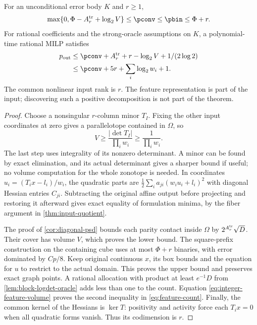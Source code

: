 \begin{theorem}\label{thm:integer-features}
For an unconditional error body $K$ and $r\ge1$,
\begin{equation}\label{eq:feature-finite}
 \max\{0,\Phi-A_r^{\rm tr}+\log_2V\}\le\pconv\le\pbin\le\Phi+r.
\end{equation}
For rational coefficients and the strong-oracle assumptions on $K$, a
polynomial-time rational MILP satisfies
\begin{equation}\label{eq:feature-count}
 \begin{split}
 p_{\rm out}&\le\pconv+A_r^{\rm tr}+r-\log_2V+1/(2\log2)\\
 &\le\pconv+5r+\sum_i\log_2w_i+1.
 \end{split}
\end{equation}
The common nonlinear input rank is $r$. The feature representation is
part of the input; discovering such a positive decomposition is not
part of the theorem.
\end{theorem}
\begin{proof}
Choose a nonsingular $r$-column minor $T_I$. Fixing the other input
coordinates at zero gives a parallelotope contained in $\Omega$, so
\begin{equation}\label{eq:integer-feature-volume}
 V\ge\frac{|\det T_I|}{\prod_iw_i}\ge\frac1{\prod_iw_i}.
\end{equation}
The last step uses integrality of its nonzero determinant. A minor can
be found by exact elimination, and its actual determinant gives a sharper
bound if useful; no volume computation for the whole zonotope is needed.
In coordinates $u_i=(T_ix-l_i)/w_i$, the quadratic parts are
$\frac12\sum_i a_{ji}(w_iu_i+l_i)^2$ with diagonal Hessian entries
$C_{ji}$. Subtracting the original affine output before projecting and
restoring it afterward gives exact equality of formulation minima,
by the fiber argument in \cref{thm:input-quotient}.

The proof of \cref{cor:diagonal-psd} bounds each parity contact inside
$\Omega$ by $2^{A_r^{\rm tr}}\sqrt D$. Their cover has volume $V$,
which proves the lower bound. The square-prefix construction on the
containing cube uses at most $\Phi+r$ binaries, with error dominated
by $Cp/8$. Keep original continuous $x$, its box bounds and the equation
for $u$ to restrict to the actual domain. This proves the upper bound
and preserves exact graph points. A rational allocation with product at
least $e^{-1}D$ from \cref{lem:block-logdet-oracle} adds less than one
to the count. Equation \eqref{eq:integer-feature-volume} proves the
second inequality in \eqref{eq:feature-count}.
Finally, the common kernel of the Hessians is $\ker T$: positivity
and activity force each $T_ix=0$ when all quadratic forms vanish.
Thus its codimension is $r$.
\end{proof}

